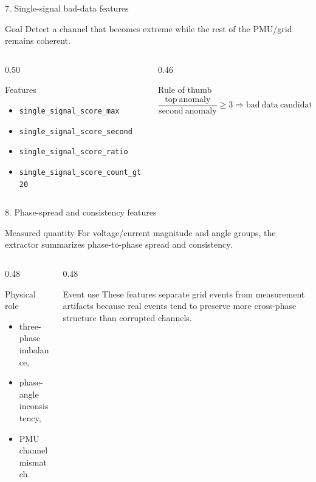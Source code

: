 \documentclass[aspectratio=169,10pt,t]{beamer}
\newcommand{\code}[1]{\texttt{\footnotesize #1}}
\begin{document}
\iffalse
\begin{frame}{7. Single-signal bad-data features}
\small
\begin{block}{Goal}
Detect a channel that becomes extreme while the rest of the PMU/grid remains coherent.
\end{block}
\begin{columns}[T,totalwidth=\textwidth]
\begin{column}{0.50\textwidth}
\begin{exampleblock}{Features}
\begin{itemize}
  \item \code{single\_signal\_score\_max}
  \item \code{single\_signal\_score\_second}
  \item \code{single\_signal\_score\_ratio}
  \item \code{single\_signal\_score\_count\_gt20}
\end{itemize}
\end{exampleblock}
\end{column}
\begin{column}{0.46\textwidth}
\begin{alertblock}{Rule of thumb}
\[
\frac{\mathrm{top\ anomaly}}{\mathrm{second\ anomaly}} \ge 3
\Rightarrow \mathrm{bad\ data\ candidate}
\]
\end{alertblock}
\end{column}
\end{columns}
\end{frame}

\begin{frame}{8. Phase-spread and consistency features}
\small
\begin{block}{Measured quantity}
For voltage/current magnitude and angle groups, the extractor summarizes phase-to-phase spread and consistency.
\end{block}
\begin{columns}[T,totalwidth=\textwidth]
\begin{column}{0.48\textwidth}
\begin{exampleblock}{Physical role}
\begin{itemize}
  \item three-phase imbalance,
  \item phase-angle inconsistency,
  \item PMU channel mismatch.
\end{itemize}
\end{exampleblock}
\end{column}
\begin{column}{0.48\textwidth}
\begin{alertblock}{Event use}
These features separate grid events from measurement artifacts because real events tend to preserve more cross-phase structure than corrupted channels.
\end{alertblock}
\end{column}
\end{columns}
\end{frame}
\end{document}
